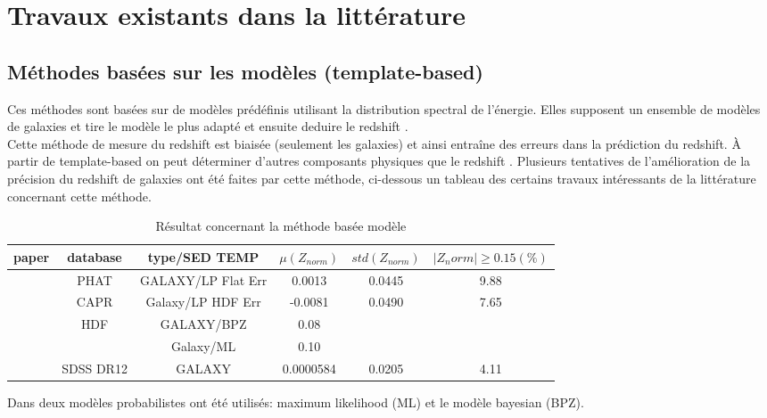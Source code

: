 
\chapter{Travaux existants dans la littérature}
\section{Méthodes basées sur les modèles (template-based)}
Ces méthodes sont basées sur de modèles prédéfinis utilisant la distribution spectral de l'énergie. Elles supposent un ensemble de modèles de galaxies et tire le modèle le plus adapté et ensuite deduire le redshift \cite{Narciso, Gabriel, photoSED}.\\ 
Cette méthode de mesure du redshift est biaisée (seulement les galaxies) et ainsi entraîne des erreurs dans la prédiction du redshift. À partir de template-based on peut déterminer d'autres composants physiques que le redshift \cite{meuphirim}. Plusieurs tentatives de l'amélioration de la précision du redshift de galaxies ont été faites par cette méthode, ci-dessous un tableau des certains travaux intéressants de la littérature concernant cette méthode.
\begin{table}[!ht]
\centering    
\begin{tabular}{|c|c|c|c|c|c|}
    \hline paper & database & type/SED TEMP & $\mu(Z_{norm})$ & $std(Z_{norm})$ & $|Z_norm|\ge0.15 (\%)$\\
    \hline 
    \multirow{2}{1cm}{\cite{sql}} & PHAT & GALAXY/LP Flat Err & 0.0013 & 0.0445 & 9.88  \\
    \cline{2-6}
     & CAPR & Galaxy/LP HDF Err & -0.0081 & 0.0490 & 7.65\\
    \hline
    \multirow{2}{1cm}{\cite{Narciso}} & \multirow{2}{1cm}{HDF} & GALAXY/BPZ & 0.08 & &  \\
    \cline{3-6} 
     &  & Galaxy/ML & 0.10 &  & \\
    \hline
    \cite{photoredSDSS} & SDSS DR12 & GALAXY & 0.0000584 & 0.0205& 4.11\\
    \hline
    
    
    
\end{tabular}
    \caption{Résultat concernant la méthode basée modèle}
    \label{base_model}
\end{table}

Dans \cite{Narciso} deux modèles probabilistes ont été utilisés: maximum likelihood (ML) et le modèle bayesian (BPZ). 

